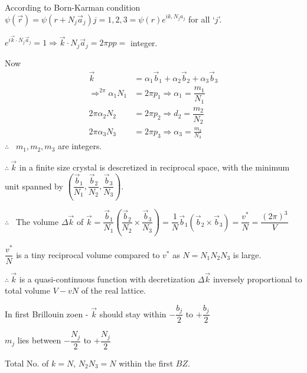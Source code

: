According to Born-Karman condition $\psi(\overrightarrow{r})=\psi(r+N_{j}\overrightarrow{a}_{j})j=1,2,3=\psi(r)e^{ik,N_{j}a_{j}}$ for all `$j$'.

$e^{i\overrightarrow{k}\cdot N_{j}\overrightarrow{a}_{j}}=1 \Rightarrow \overrightarrow{k}\cdot N_{j}\overrightarrow{a}_{j}=2\pi p$\quad $p=$ integer.

Now 
\begin{align*}
\overrightarrow{k} &= \alpha_{1}\overrightarrow{b}_{1}+\alpha_{2}\overrightarrow{b}_{2}+\alpha_{3}\overrightarrow{b}_{3}\\
\Rightarrow^{2\pi}\alpha_{1}N_{1} &=2\pi p_{1}\Rightarrow\alpha_{1}=\dfrac{m_{1}}{N_{1}}\\
2\pi \alpha_{2}N_{2} &= 2\pi p_{2}\Rightarrow d_{2}=\dfrac{m_{2}}{N_{2}}\\
2\pi\alpha_{3}N_{3} &= 2\pi p_{3}\Rightarrow \alpha_{3}=\frac{m_{3}}{N_{3}}
\end{align*}
$\therefore$ \ \quad $m_{1},m_{2},m_{3}$ are integers.

$\therefore \ \overrightarrow{k}$ in a finite size crystal is descretized in reciprocal space, with the minimum unit spanned by $\left(\dfrac{\overrightarrow{b}_{1}}{N_{1}},\dfrac{\overrightarrow{b}_{2}}{N_{2}},\dfrac{\overrightarrow{b}_{3}}{N_{3}}\right)$.

$\therefore$ \ The volume $\Delta \overrightarrow{k}$ of $\overrightarrow{k}=\dfrac{\overrightarrow{b}_{1}}{N_{1}}\left(\dfrac{\overrightarrow{b}_{2}}{N_{2}}\times \dfrac{\overrightarrow{b}_{3}}{N_{3}}\right)=\dfrac{1}{N}\overrightarrow{b}_{1}(\overrightarrow{b}_{2}\times \overrightarrow{b}_{3})=\dfrac{v^{*}}{N}=\dfrac{(2\pi)^{3}}{V}$

$\dfrac{v^{*}}{N}$ is a tiny reciprocal volume compared to $v^{*}$ as $N=N_{1}N_{2}N_{3}$ is large.

$\therefore \ \overrightarrow{k}$ is a quasi-continuous function with decretization $\Delta \overrightarrow{k}$ inversely proportional to total volume $V-vN$ of the real lattice.

In first Brillouin zoen - $\overrightarrow{k}$ should stay within $-\dfrac{b_{j}}{2}$ to $+\dfrac{b_{j}}{2}$

$m_{j}$ lies between $-\dfrac{N_{j}}{2}$ to $+\dfrac{N_{j}}{2}$

Total No. of $k=N$, $N_{2}N_{3}=N$ within the first $BZ$.

